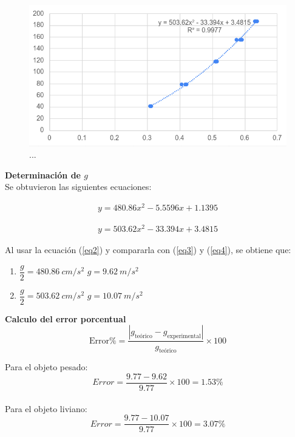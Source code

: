 \begin{multicols}{2}
\begin{figure}[H]
    \centering
    \includegraphics[scale=0.5]{fig/regresion-ObjetoLiviano.png}
    \caption{...}
\end{figure}

\textbf{Determinación de $g$} \\
Se obtuvieron las siguientes ecuaciones:

\begin{align}\label{eq3}
    y = 480.86x^2 - 5.5596x + 1.1395
\end{align}

\begin{align}\label{eq4}
    y = 503.62x^2 - 33.394x + 3.4815
\end{align}

Al usar la ecuación (\ref{eq2}) y compararla con (\ref{eq3}) y (\ref{eq4}), se obtiene que:
\begin{enumerate}
    \item $\dfrac{g}{2} = 480.86 \ cm/s^2$ \hspace{1cm} $g = 9.62 \ m/s^2$
    \item $\dfrac{g}{2} = 503.62 \ cm/s^2$ \hspace{1cm} $g = 10.07 \ m/s^2$
\end{enumerate}

\textbf{Calculo del error porcentual} \\

\[\text{Error\%} = \frac{|g_{\text{teórico}} - g_{\text{experimental}}|}{g_{\text{teórico}}} \times 100 \]

Para el objeto pesado: \[Error = \dfrac{9.77 - 9.62}{9.77} \times 100 = 1.53\%\] \\
Para el objeto liviano: \[Error = \dfrac{9.77 - 10.07}{9.77} \times 100 = 3.07\%\]




\end{multicols}

